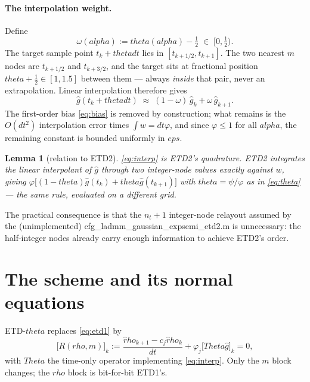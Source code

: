 \documentclass[11pt]{article}
\newtheorem{lemma}{Lemma}
\newcommand{\eps}{\varepsilon}
\newcommand{\dt}{\Delta t}
\newcommand{\dx}{\Delta x}
\newcommand{\code}[1]{\texttt{#1}}
\def\theta{theta}\def\Theta{Theta}\def\alpha{alpha}\def\rho{rho}%
\def\eps{eps}\def\dt{dt}\def\dx{dx}\def\code#1{#1}%
\begin{document}
\paragraph{The interpolation weight.} Define
\begin{equation}
  \omega(\alpha) := \theta(\alpha)-\tfrac12 \;\in\; [0,\tfrac12).
  \label{eq:omega}
\end{equation}
The target sample point $t_k+\theta\dt$ lies in $[t_{k+1/2},t_{k+1}]$. The two nearest
$m$ nodes are $t_{k+1/2}$ and $t_{k+3/2}$, and the target sits at fractional position
$\theta+\tfrac12\in[1,1.5]$ between them --- always \emph{inside} that pair, never an
extrapolation. Linear interpolation therefore gives
\begin{equation}
  \hat g(t_k+\theta\dt) \;\approx\; (1-\omega)\,\hat g_k + \omega\,\hat g_{k+1}.
  \label{eq:interp}
\end{equation}
The first-order bias \eqref{eq:bias} is removed by construction; what remains is the
$O(\dt^2)$ interpolation error times $\int w=\dt\varphi$, and since $\varphi\le1$ for
all $\alpha$, the remaining constant is bounded uniformly in $\eps$.

\begin{lemma}[relation to ETD2]
\eqref{eq:interp} is ETD2's quadrature. ETD2 integrates the linear interpolant of $\hat
g$ through two \emph{integer}-node values exactly against $w$, giving
$\varphi\bigl[(1-\theta)\hat g(t_k)+\theta\hat g(t_{k+1})\bigr]$ with $\theta=\psi/\varphi$
as in \eqref{eq:theta} --- the same rule, evaluated on a different grid.
\end{lemma}

The practical consequence is that the $n_t+1$ integer-node relayout assumed by the
(unimplemented) \code{cfg\_ladmm\_gaussian\_expsemi\_etd2.m} is unnecessary: the
half-integer nodes already carry enough information to achieve ETD2's order.

\section{The scheme and its normal equations}

ETD-$\theta$ replaces \eqref{eq:etd1} by
\begin{equation}
  \bigl[R(\rho,m)\bigr]_k
  := \frac{\hat\rho_{k+1}-c_j\hat\rho_k}{\dt}
   + \varphi_j\bigl[\Theta\hat g\bigr]_k = 0,
  \label{eq:etdtheta}
\end{equation}
with $\Theta$ the time-only operator implementing \eqref{eq:interp}. Only the $m$ block
changes; the $\rho$ block is bit-for-bit ETD1's.
\end{document}
